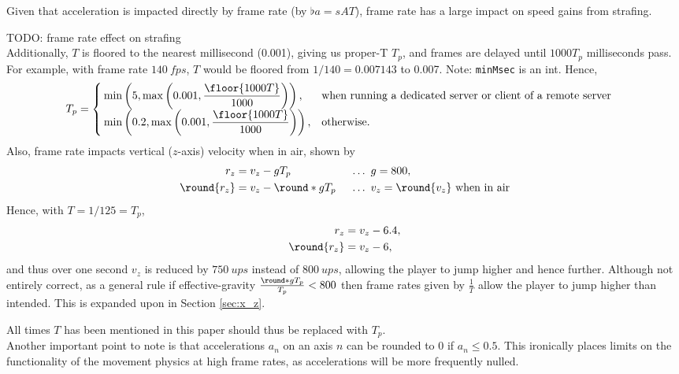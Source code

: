 Given that acceleration is impacted directly by frame rate (by $\flat{a} = sAT$), frame rate has a large impact on speed gains from strafing.

TODO: frame rate effect on strafing\\

Additionally, $T$ is floored to the nearest millisecond (0.001), giving us proper-T $T_p$, and frames are delayed until $1000T_p$ milliseconds pass.
For example, with frame rate $\qty{140}{fps}$, $T$ would be floored from $1/140 = 0.007143$ to 0.007. Note: \texttt{minMsec} is an int.
Hence,
\begin{align*}
T_p &=
\begin{cases}
\min\left(5, \max\left(0.001, \dfrac{\floor{1000T}}{1000} \right) \right), & \text{when running a dedicated server or client of a remote server}\\
\min\left(0.2, \max\left(0.001, \dfrac{\floor{1000T}}{1000} \right) \right), & \text{otherwise.}
\end{cases}
\end{align*}
Also, frame rate impacts vertical ($z$-axis) velocity when in air, shown by
\begin{align*}
r_z &= v_z - gT_p\ &&\ldots\ g = 800,\\
\round{r_z} &= v_z - \round*{gT_p}\ &&\ldots\ v_z = \round{v_z}\ \text{when in air}
\end{align*}
Hence, with $T = 1/125 = T_p$,
\begin{align*}
r_z &= v_z - 6.4,\\
\round{r_z} &= v_z - 6,
\end{align*}
and thus over one second $v_z$ is reduced by $\qty{750}{ups}$ instead of $\qty{800}{ups}$, allowing the player to jump higher and hence further.
Although not entirely correct, as a general rule if effective-gravity $\frac{\round*{gT_p}}{T_p} < 800$ then frame rates given by $\frac{1}{T}$ allow the player to jump higher than intended.
This is expanded upon in Section \ref{sec:x_z}.

All times $T$ has been mentioned in this paper should thus be replaced with $T_p$.\\

Another important point to note is that accelerations $a_n$ on an axis $n$ can be rounded to $0$ if $a_n\le 0.5$.
This ironically places limits on the functionality of the movement physics at high frame rates, as accelerations will be more frequently nulled.

